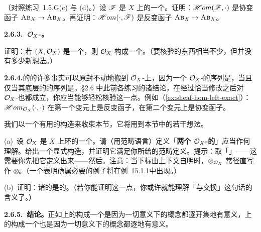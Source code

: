 \begin{exercise}\label{ex:sheaf-hom-left-exact}
（对照\mbox{练习~1.5.G}(c) 与 (d)。）设 $\mathscr{F}$ 是\trTopologicalSpace{} $X$ 上\trAbelianGroups{}的一个\trSheaf。证明：$\mathscr{H}om(\mathscr{F},\cdot)$ 是\trLeftExact{}协变函子 $\textsc{Ab}_{X}\to\textsc{Ab}_{X}$。再证明：$\mathscr{H}om(\cdot,\mathscr{F})$ 是\trLeftExact{}反变函子 $\textsc{Ab}_{X}\to\textsc{Ab}_{X}$。
\end{exercise}

\textbf{2.6.3.\ $\mathcal{O}_X$-\trModule。}

\begin{exercise}\label{ex:ox-modules-abelian-category}
证明：若 $(X,\mathcal{O}_X)$ 是一个\trRingedSpace，则 $\mathcal{O}_X$-\trModule{}构成一个\trAbelianCategory。（要核验的东西相当不少，但并没有多少新想法。）
\end{exercise}

\textbf{2.6.4.}\quad \trAbelianGroups{}的\trSheaves{}的许多事实可以原封不动地搬到 $\mathcal{O}_X$-\trModule{}上，因为一个 $\mathcal{O}_X$-\trModule{}的序列是\trExactSequence，当且仅当其底层的\trAbelianGroups{}的\trSheaves{}序列是\trExactSequence。§2.6 中此前各练习的诸结论，在经过恰当修改之后对 $\mathcal{O}_X$-\trModule{}也都成立，你应当能够轻松核验这一点。例如（\cref{ex:sheaf-hom-left-exact}）：$\mathscr{H}om_{\mathcal{O}_X}(\cdot,\cdot)$ 在第一个变元上是\trLeftExact{}反变函子，在第二个变元上是\trLeftExact{}协变函子。

我们以一个有用的构造来收束本节，它将用到本节中的若干想法。

\begin{exercise}\label{ex:ox-module-tensor-product}
(a)~设 $\mathcal{O}_X$ 是 $X$ 上环的一个\trSheaf。请（用范畴语言）定义「\textbf{两个 $\mathcal{O}_X$-\trModule{}的\trTensorProduct}」应当作何理解。给出一个显式构造，并证明它满足你所给的范畴定义。提示：取「\trPresheaf\trTensorProduct」——这需要你先把它定义出来——然后\trSheafification。注意：当下标由上下文自明时，$\otimes_{\mathcal{O}_X}$ 常径直写作 $\otimes$。（一个表明\trSheafification{}确属必要的例子将在\mbox{例~15.1.1}中出现。）

(b)~证明：诸\trStalk{}的\trTensorProduct{}是\trTensorProduct{}的\trStalk。（若你能证明这一点，你或许就能理解「\trColimit{}与\trTensorProduct{}交换」这句话的含义了。）
\end{exercise}

\textbf{2.6.5.\ 结论。}\quad 正如\trTopologicalSpace{}上\trAbelianGroups{}的\trPresheaf{}构成一个\trAbelianCategory{}是因为一切\trAbelianCategory{}意义下的概念都逐开集地有意义，\trTopologicalSpace{}上\trAbelianGroups{}的\trSheaves{}构成一个\trAbelianCategory{}也是因为一切\trAbelianCategory{}意义下的概念都逐\trStalk{}地有意义。

